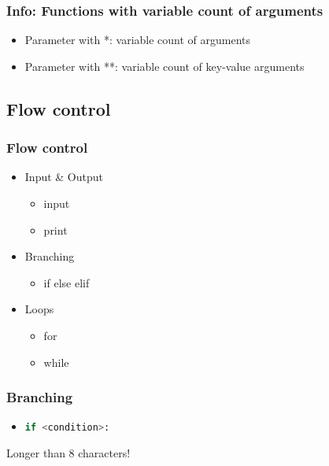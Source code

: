 \documentclass[ngerman]{beamer}
\newcommand{\ta}[1]{\textattachfile[color=1 0 0]{#1}{Code}}
\begin{document}
\begin{frame}
\frametitle{Info: Functions with variable count of arguments}

\begin{itemize}
\item Parameter with *: variable count of arguments
\item Parameter with **: variable count of key-value arguments
\end{itemize}





\end{frame}


\subsection{Flow control}

\begin{frame}
\frametitle{Flow control}

\begin{itemize}
\item Input \& Output \checkmark
\begin{itemize}
	\item input
	\item print
\end{itemize}

\item Branching
\begin{itemize}
	\item if else elif
\end{itemize}

\item Loops
\begin{itemize}
	\item for
	\item while
\end{itemize}

\end{itemize}
\end{frame}

\begin{frame}[containsverbatim]
\frametitle{Branching}

\begin{itemize}
\item \lstinline[language={Python}]{if <condition>:}
\end{itemize}



\begin{ausgabe}
Longer than 8 characters!
\end{ausgabe}
\end{frame}
\end{document}
